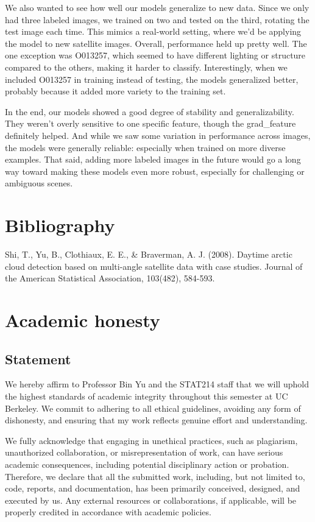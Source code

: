 \documentclass[10pt,letterpaper]{article}
\begin{document}
We also wanted to see how well our models generalize to new data. Since we only had three labeled images, we trained on two and tested on the third, rotating the test image each time. This mimics a real-world setting, where we’d be applying the model to new satellite images. Overall, performance held up pretty well. The one exception was O013257, which seemed to have different lighting or structure compared to the others, making it harder to classify. Interestingly, when we included O013257 in training instead of testing, the models generalized better, probably because it added more variety to the training set.


In the end, our models showed a good degree of stability and generalizability. They weren’t overly sensitive to one specific feature, though the grad\_feature definitely helped. And while we saw some variation in performance across images, the models were generally reliable: especially when trained on more diverse examples. That said, adding more labeled images in the future would go a long way toward making these models even more robust, especially for challenging or ambiguous scenes.

\newpage
\section{Bibliography}
Shi, T., Yu, B., Clothiaux, E. E., \& Braverman, A. J. (2008). Daytime arctic cloud detection based on multi-angle satellite data with case studies. Journal of the American Statistical Association, 103(482), 584-593.

\appendix

\section{Academic honesty}

\subsection{Statement}
We hereby affirm to Professor Bin Yu and the STAT214 staff that we will uphold the highest standards of academic integrity throughout this semester at UC Berkeley. We commit to adhering to all ethical guidelines, avoiding any form of dishonesty, and ensuring that my work reflects genuine effort and understanding.

We fully acknowledge that engaging in unethical practices, such as plagiarism, unauthorized collaboration, or misrepresentation of work, can have serious academic consequences, including potential disciplinary action or probation. Therefore, we declare that all the submitted work, including, but not limited to, code, reports, and documentation, has been primarily conceived, designed, and executed by us. Any external resources or collaborations, if applicable, will be properly credited in accordance with academic policies.
\end{document}
